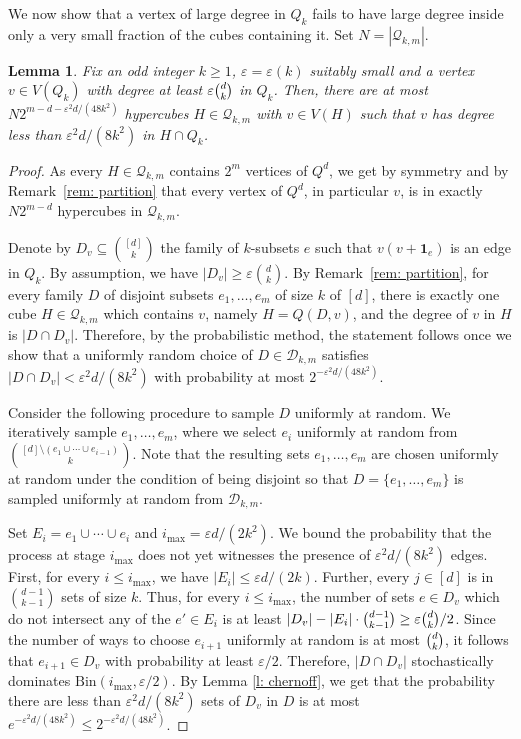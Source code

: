 \documentclass{article}
\newtheorem{lemma}[thm]{Lemma}
\theoremstyle{definition}
\newcommand{\eps}{\varepsilon}
\newcommand{\ben}[1]{{\color{orange}{ [~Benny:\ }\emph{#1}\textbf{~]}}}
\newcommand{\cD}{\mathcal{D}}
\newcommand{\cQ}{\mathcal{Q}}
\begin{document}
We now show that a vertex of large degree in $Q_k$ fails to have large degree inside only a very small fraction of the cubes containing it. Set $N=|\cQ_{k,m}|$. 
\begin{lemma}\label{lem: vertex is good}
Fix an odd integer $k\ge 1$, $\eps=\eps(k)$ suitably small and a vertex $v\in V(Q_k)$ with degree at least $\varepsilon \tbinom{d}{k}$ in $Q_k$. Then, there are at most $N2^{m-d-\varepsilon^2 d/(48k^2)}$ hypercubes $H\in\cQ_{k,m}$ with $v\in V(H)$ such that $v$ has degree less than $\varepsilon^2 d/(8k^2)$ in $H\cap Q_k$.
\end{lemma}
\begin{proof}
    As every $H\in\cQ_{k,m}$ contains $2^m$ vertices of $Q^d$, we get by symmetry and by Remark~\ref{rem: partition} that every vertex of $Q^d$, in particular $v$, is in exactly $N2^{m-d}$ hypercubes in $\cQ_{k,m}$.
    
    Denote by $D_v\subseteq \binom{[d]}{k}$ the family of $k$-subsets $e$ such that $v(v+\mathbf{1}_{e})$ is an edge in $Q_k$. 
    By assumption, we have $|D_v|\geq \varepsilon \binom{d}{k}$. 
    By Remark~\ref{rem: partition}, for every family $D$ of disjoint subsets $e_1,\ldots,e_m$ of size $k$ of $[d]$, there is exactly one cube $H\in\cQ_{k,m}$ which contains $v$, namely $H=Q(D,v)$, and the degree of $v$ in $H$ is $|D\cap D_v|$. 
    Therefore, by the probabilistic method, the statement follows once we show that a uniformly random choice of $D\in \cD_{k,m}$ satisfies $|D\cap D_v|<\varepsilon^2 d/(8k^2)$ with probability at most $2^{-\varepsilon^2 d/(48k^2)}$. 
    
    Consider the following procedure to sample $D$ uniformly at random. We iteratively sample $e_1,\ldots,e_m$, where we select $e_i$ uniformly at random from $\binom{[d]\setminus(e_1\cup\cdots\cup e_{i-1})}{k}$. 
    Note that the resulting sets $e_1,\ldots,e_m$ are chosen uniformly at random under the condition of being disjoint so that $D=\{e_1,\ldots,e_m\}$ is sampled uniformly at random from $\cD_{k,m}$. 
    
    Set $E_i=e_1\cup\cdots\cup e_i$ and $i_{\max} = \eps d/(2k^2)$. 
    We bound the probability that the process at stage $i_{\max}$ does not yet witnesses the presence of $\eps^2 d/(8k^2)$ edges.
    First, for every $i\leq i_{\max}$, we have $|E_i|\leq \varepsilon d/(2k)$. Further, every $j\in[d]$ is in 
    $\binom{d-1}{k-1}$
    sets of size $k$. 
    Thus, for every $i\le i_{\max}$, the number of sets $e\in D_v$ which do not intersect any of the $e'\in E_i$ is at least $|D_v|-|E_i|\cdot \binom{d-1}{k-1}\ge \eps \tbinom{d}{k}/2$. %
    Since the number of ways to choose $e_{i+1}$ uniformly at random is at most %
    $\tbinom{d}{k}$, it follows that $e_{i+1}\in D_v$ with probability at least $\varepsilon/2$. Therefore, $|D\cap D_v|$ stochastically dominates $\mathrm{Bin}(i_{\max},\varepsilon/2)$. By Lemma \ref{l: chernoff}, we get that the probability there are less than $\varepsilon^2 d/(8k^2)$ sets of $D_v$ in $D$ is at most $e^{-\varepsilon^2d/(48k^2)}\leq 2^{-\varepsilon^2d/(48k^2)}$.
\end{proof}
\end{document}
